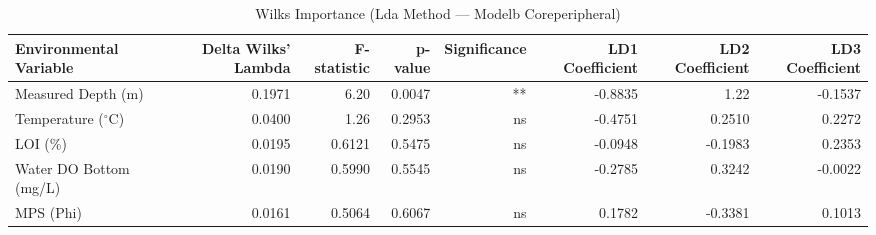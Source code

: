 \begin{table}[htbp]
  \centering
  \caption{Wilks Importance (Lda Method — Modelb Coreperipheral)}
  \label{tab:LDA_Method_ModelB_CorePeripheral_tables_wilks_importance}
  \small
  \begin{tabular}{lrrrrrrr}
    \toprule
    Environmental Variable & Delta Wilks' Lambda & F-statistic & p-value & Significance & LD1 Coefficient & LD2 Coefficient & LD3 Coefficient \\
    \midrule
    Measured Depth (m) & 0.1971 & 6.20 & 0.0047 & ** & -0.8835 & 1.22 & -0.1537 \\
    Temperature ($^{\circ}$C) & 0.0400 & 1.26 & 0.2953 & ns & -0.4751 & 0.2510 & 0.2272 \\
    LOI (\%) & 0.0195 & 0.6121 & 0.5475 & ns & -0.0948 & -0.1983 & 0.2353 \\
    Water DO Bottom (mg/L) & 0.0190 & 0.5990 & 0.5545 & ns & -0.2785 & 0.3242 & -0.0022 \\
    MPS (Phi) & 0.0161 & 0.5064 & 0.6067 & ns & 0.1782 & -0.3381 & 0.1013 \\
    \bottomrule
  \end{tabular}
\end{table}
